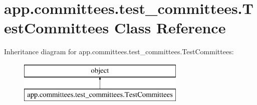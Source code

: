 \hypertarget{classapp_1_1committees_1_1test__committees_1_1_test_committees}{}\section{app.\+committees.\+test\+\_\+committees.\+Test\+Committees Class Reference}
\label{classapp_1_1committees_1_1test__committees_1_1_test_committees}
Inheritance diagram for app.\+committees.\+test\+\_\+committees.\+Test\+Committees\+:\begin{figure}[H]
\begin{center}
\leavevmode
\includegraphics[height=2.000000cm]{classapp_1_1committees_1_1test__committees_1_1_test_committees}
\end{center}
\end{figure}
